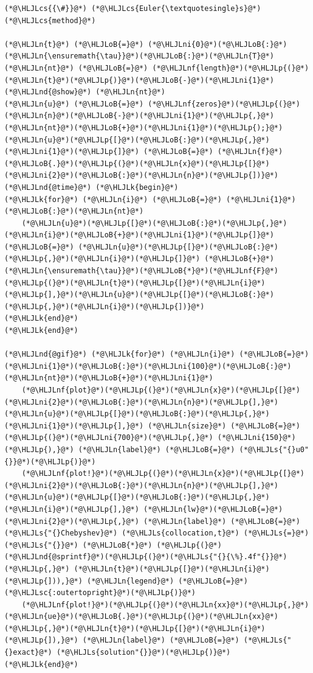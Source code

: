\documentclass[12pt,a4paper]{article}
\newcommand{\HLJLk}[1]{\textcolor[RGB]{148,91,176}{\textbf{#1}}}
\newcommand{\HLJLn}[1]{#1}
\newcommand{\HLJLnd}[1]{\textcolor[RGB]{214,102,97}{#1}}
\newcommand{\HLJLnf}[1]{\textcolor[RGB]{66,102,213}{#1}}
\newcommand{\HLJLs}[1]{\textcolor[RGB]{201,61,57}{#1}}
\newcommand{\HLJLsc}[1]{\textcolor[RGB]{201,61,57}{#1}}
\newcommand{\HLJLni}[1]{\textcolor[RGB]{59,151,46}{#1}}
\newcommand{\HLJLoB}[1]{\textcolor[RGB]{102,102,102}{\textbf{#1}}}
\newcommand{\HLJLp}[1]{#1}
\newcommand{\HLJLcs}[1]{\textcolor[RGB]{153,153,119}{\textit{#1}}}
\begin{document}
\begin{lstlisting}
(*@\HLJLcs{{\#}}@*) (*@\HLJLcs{Euler{\textquotesingle}s}@*) (*@\HLJLcs{method}@*)

(*@\HLJLn{t}@*) (*@\HLJLoB{=}@*) (*@\HLJLni{0}@*)(*@\HLJLoB{:}@*)(*@\HLJLn{\ensuremath{\tau}}@*)(*@\HLJLoB{:}@*)(*@\HLJLn{T}@*)
(*@\HLJLn{nt}@*) (*@\HLJLoB{=}@*) (*@\HLJLnf{length}@*)(*@\HLJLp{(}@*)(*@\HLJLn{t}@*)(*@\HLJLp{)}@*)(*@\HLJLoB{-}@*)(*@\HLJLni{1}@*)
(*@\HLJLnd{@show}@*) (*@\HLJLn{nt}@*)
(*@\HLJLn{u}@*) (*@\HLJLoB{=}@*) (*@\HLJLnf{zeros}@*)(*@\HLJLp{(}@*)(*@\HLJLn{n}@*)(*@\HLJLoB{-}@*)(*@\HLJLni{1}@*)(*@\HLJLp{,}@*)(*@\HLJLn{nt}@*)(*@\HLJLoB{+}@*)(*@\HLJLni{1}@*)(*@\HLJLp{);}@*) (*@\HLJLn{u}@*)(*@\HLJLp{[}@*)(*@\HLJLoB{:}@*)(*@\HLJLp{,}@*)(*@\HLJLni{1}@*)(*@\HLJLp{]}@*) (*@\HLJLoB{=}@*) (*@\HLJLn{f}@*)(*@\HLJLoB{.}@*)(*@\HLJLp{(}@*)(*@\HLJLn{x}@*)(*@\HLJLp{[}@*)(*@\HLJLni{2}@*)(*@\HLJLoB{:}@*)(*@\HLJLn{n}@*)(*@\HLJLp{])}@*)
(*@\HLJLnd{@time}@*) (*@\HLJLk{begin}@*)
(*@\HLJLk{for}@*) (*@\HLJLn{i}@*) (*@\HLJLoB{=}@*) (*@\HLJLni{1}@*)(*@\HLJLoB{:}@*)(*@\HLJLn{nt}@*)
    (*@\HLJLn{u}@*)(*@\HLJLp{[}@*)(*@\HLJLoB{:}@*)(*@\HLJLp{,}@*)(*@\HLJLn{i}@*)(*@\HLJLoB{+}@*)(*@\HLJLni{1}@*)(*@\HLJLp{]}@*) (*@\HLJLoB{=}@*) (*@\HLJLn{u}@*)(*@\HLJLp{[}@*)(*@\HLJLoB{:}@*)(*@\HLJLp{,}@*)(*@\HLJLn{i}@*)(*@\HLJLp{]}@*) (*@\HLJLoB{+}@*) (*@\HLJLn{\ensuremath{\tau}}@*)(*@\HLJLoB{*}@*)(*@\HLJLnf{F}@*)(*@\HLJLp{(}@*)(*@\HLJLn{t}@*)(*@\HLJLp{[}@*)(*@\HLJLn{i}@*)(*@\HLJLp{],}@*)(*@\HLJLn{u}@*)(*@\HLJLp{[}@*)(*@\HLJLoB{:}@*)(*@\HLJLp{,}@*)(*@\HLJLn{i}@*)(*@\HLJLp{])}@*)
(*@\HLJLk{end}@*)
(*@\HLJLk{end}@*)

(*@\HLJLnd{@gif}@*) (*@\HLJLk{for}@*) (*@\HLJLn{i}@*) (*@\HLJLoB{=}@*) (*@\HLJLni{1}@*)(*@\HLJLoB{:}@*)(*@\HLJLni{100}@*)(*@\HLJLoB{:}@*)(*@\HLJLn{nt}@*)(*@\HLJLoB{+}@*)(*@\HLJLni{1}@*)
    (*@\HLJLnf{plot}@*)(*@\HLJLp{(}@*)(*@\HLJLn{x}@*)(*@\HLJLp{[}@*)(*@\HLJLni{2}@*)(*@\HLJLoB{:}@*)(*@\HLJLn{n}@*)(*@\HLJLp{],}@*) (*@\HLJLn{u}@*)(*@\HLJLp{[}@*)(*@\HLJLoB{:}@*)(*@\HLJLp{,}@*)(*@\HLJLni{1}@*)(*@\HLJLp{],}@*) (*@\HLJLn{size}@*) (*@\HLJLoB{=}@*) (*@\HLJLp{(}@*)(*@\HLJLni{700}@*)(*@\HLJLp{,}@*) (*@\HLJLni{150}@*)(*@\HLJLp{),}@*) (*@\HLJLn{label}@*) (*@\HLJLoB{=}@*) (*@\HLJLs{"{}u0"{}}@*)(*@\HLJLp{)}@*)
    (*@\HLJLnf{plot!}@*)(*@\HLJLp{(}@*)(*@\HLJLn{x}@*)(*@\HLJLp{[}@*)(*@\HLJLni{2}@*)(*@\HLJLoB{:}@*)(*@\HLJLn{n}@*)(*@\HLJLp{],}@*) (*@\HLJLn{u}@*)(*@\HLJLp{[}@*)(*@\HLJLoB{:}@*)(*@\HLJLp{,}@*)(*@\HLJLn{i}@*)(*@\HLJLp{],}@*) (*@\HLJLn{lw}@*)(*@\HLJLoB{=}@*)(*@\HLJLni{2}@*)(*@\HLJLp{,}@*) (*@\HLJLn{label}@*) (*@\HLJLoB{=}@*) (*@\HLJLs{"{}Chebyshev}@*) (*@\HLJLs{collocation,t}@*) (*@\HLJLs{=}@*) (*@\HLJLs{"{}}@*) (*@\HLJLoB{*}@*) (*@\HLJLp{(}@*)(*@\HLJLnd{@sprintf}@*)(*@\HLJLp{(}@*)(*@\HLJLs{"{}{\%}.4f"{}}@*)(*@\HLJLp{,}@*) (*@\HLJLn{t}@*)(*@\HLJLp{[}@*)(*@\HLJLn{i}@*)(*@\HLJLp{])),}@*) (*@\HLJLn{legend}@*) (*@\HLJLoB{=}@*) (*@\HLJLsc{:outertopright}@*)(*@\HLJLp{)}@*)
    (*@\HLJLnf{plot!}@*)(*@\HLJLp{(}@*)(*@\HLJLn{xx}@*)(*@\HLJLp{,}@*) (*@\HLJLn{ue}@*)(*@\HLJLoB{.}@*)(*@\HLJLp{(}@*)(*@\HLJLn{xx}@*)(*@\HLJLp{,}@*)(*@\HLJLn{t}@*)(*@\HLJLp{[}@*)(*@\HLJLn{i}@*)(*@\HLJLp{]),}@*) (*@\HLJLn{label}@*) (*@\HLJLoB{=}@*) (*@\HLJLs{"{}exact}@*) (*@\HLJLs{solution"{}}@*)(*@\HLJLp{)}@*)
(*@\HLJLk{end}@*)
\end{lstlisting}
\end{document}
